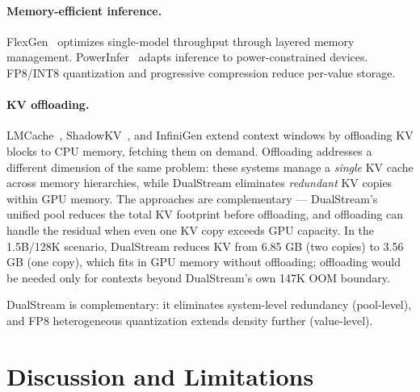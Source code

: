 \documentclass[review]{elsarticle}
\theoremstyle{definition}
\theoremstyle{remark}
\begin{document}
\paragraph{Memory-efficient inference.}
FlexGen~\cite{flexgen2022} optimizes single-model throughput through
layered memory management. PowerInfer~\cite{powerinfer2024} adapts
inference to power-constrained devices. FP8/INT8 quantization
\cite{kvquant2024} and progressive compression reduce per-value storage.

\paragraph{KV offloading.}
LMCache~\cite{lmcache2025}, ShadowKV~\cite{shadowkv2025}, and
InfiniGen extend context windows by offloading KV blocks to CPU
memory, fetching them on demand. Offloading addresses a different
dimension of the same problem: these systems manage a \emph{single}
KV cache across memory hierarchies, while DualStream eliminates
\emph{redundant} KV copies within GPU memory. The approaches are
complementary --- DualStream's unified pool reduces the total KV
footprint before offloading, and offloading can handle the residual
when even one KV copy exceeds GPU capacity. In the 1.5B/128K
scenario, DualStream reduces KV from 6.85 GB (two copies) to
3.56 GB (one copy), which fits in GPU memory without offloading;
offloading would be needed only for contexts beyond DualStream's own
147K OOM boundary.

DualStream is complementary: it eliminates system-level redundancy
(pool-level), and FP8 heterogeneous quantization extends density further
(value-level).

\section{Discussion and Limitations}
\end{document}
